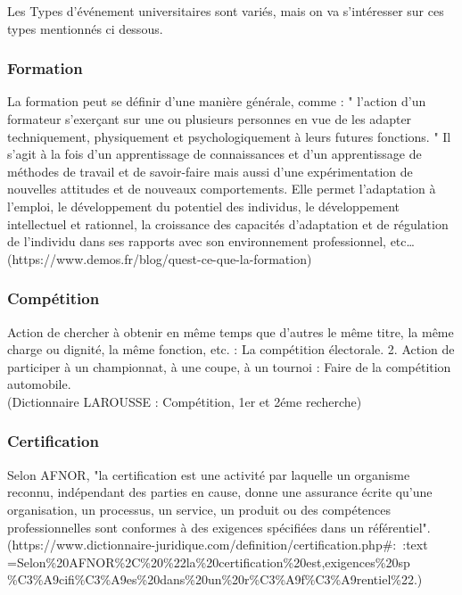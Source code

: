 \documentclass[12pt]{report}
\begin{document}
Les Types d'événement universitaires sont variés, mais on va s'intéresser sur ces types mentionnés ci dessous.

\subsubsection{Formation}

La formation peut se définir d’une manière générale, comme : " l’action d’un formateur s’exerçant  sur une ou plusieurs personnes en vue de les adapter techniquement, physiquement et psychologiquement à leurs futures fonctions. " Il s’agit à la fois d’un apprentissage de connaissances et d’un apprentissage de méthodes de travail et de savoir-faire mais aussi d’une expérimentation de nouvelles attitudes et de nouveaux comportements. Elle permet l’adaptation à l’emploi, le développement du potentiel des individus, le développement intellectuel et rationnel, la croissance des capacités d’adaptation et de régulation de l’individu dans ses rapports avec son environnement professionnel, etc…
\\(https://www.demos.fr/blog/quest-ce-que-la-formation)

\subsubsection{Compétition}

 Action de chercher à obtenir en même temps que d'autres le même titre, la même charge ou dignité, la même fonction, etc. : La compétition électorale. 2. Action de participer à un championnat, à une coupe, à un tournoi : Faire de la compétition automobile.
\\(Dictionnaire LAROUSSE : Compétition, 1er et 2éme recherche)

\subsubsection{Certification}

Selon AFNOR, "la certification est une activité par laquelle un organisme reconnu, indépendant des parties en cause, donne une assurance écrite qu'une organisation, un processus, un service, un produit ou des compétences professionnelles sont conformes à des exigences spécifiées dans un référentiel".
\\(https://www.dictionnaire-juridique.com/definition/certification.php\#:~:text\\=Selon\%20AFNOR\%2C\%20\%22la\%20certification\%20est,exigences\%20sp\\\%C3\%A9cifi\%C3\%A9es\%20dans\%20un\%20r\%C3\%A9f\%C3\%A9rentiel\%22.)
\end{document}
